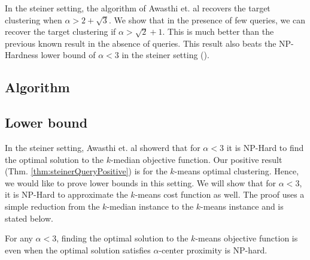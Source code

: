 \documentclass[orivec]{llncs}
\begin{document}
In the steiner setting, the algorithm of Awasthi et. al \cite{awasthi2012center} recovers the target clustering when $\alpha > 2+\sqrt{3}$. We show that in the presence of few queries, we can recover the target clustering if $\alpha > \sqrt{2}+1$. This is much better than the previous known result in the absence of queries. This result also beats the NP-Hardness lower bound of $\alpha < 3$ in the steiner setting (\cite{awasthi2012center}).

\subsection{Algorithm}


\subsection{Lower bound}
In the steiner setting, Awasthi et. al \cite{awasthi2012center} showerd that for $\alpha < 3$ it is NP-Hard to find the optimal solution to the $k$-median objective function. Our positive result (Thm. \ref{thm:steinerQueryPositive}) is for the $k$-means optimal clustering. Hence, we would like to prove lower bounds in this setting. We will show that for $\alpha < 3$, it is NP-Hard to approximate the $k$-means cost function as well. The proof uses a simple reduction from the $k$-median instance to the $k$-means instance and is stated below.

\begin{theorem}
For any $\alpha < 3$, finding the optimal solution to the $k$-means objective function is even when the optimal solution satisfies $\alpha$-center proximity is NP-hard.
\end{theorem}
\end{document}

